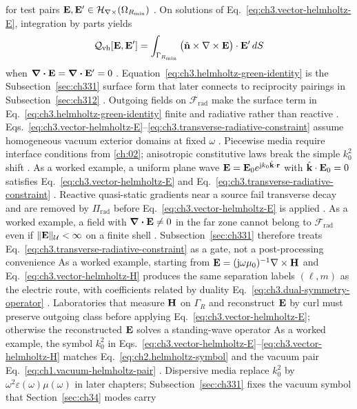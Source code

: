 for test pairs \(\mathbf{E},\mathbf{E}'\in\mathcal{H}_{\nabla\times}(\Omega_{R_{\min}})\) . On solutions of
Eq.~\eqref{eq:ch3.vector-helmholtz-E}, integration by parts yields
\begin{equation}
\label{eq:ch3.helmholtz-green-identity}
\mathcal{Q}_{\mathrm{vh}}[\mathbf{E},\mathbf{E}']
=
\int_{\Gamma_{R_{\min}}}
\big(\hat{\mathbf{n}}\times\nabla\times\mathbf{E}\big)\cdot\mathbf{E}'\,dS
\end{equation}
when \(\div\mathbf{E}=\div\mathbf{E}'=0\) . Equation~\eqref{eq:ch3.helmholtz-green-identity}
is the Subsection~\ref{sec:ch331} surface form that later connects to reciprocity pairings in
Subsection~\ref{sec:ch312} . Outgoing fields on
\(\mathcal{F}_{\mathrm{rad}}\) make the surface term in Eq.~\eqref{eq:ch3.helmholtz-green-identity} finite and
radiative rather than reactive .
Eqs.~\eqref{eq:ch3.vector-helmholtz-E}--\eqref{eq:ch3.transverse-radiative-constraint} assume homogeneous vacuum
exterior domains at fixed \(\omega\) . Piecewise media require interface conditions from
\ref{ch:02}; anisotropic constitutive laws break the simple \(k_0^2\) shift .
As a worked example, a uniform plane wave \(\mathbf{E}=\mathbf{E}_0 e^{\mathrm{j} k_0\hat{\mathbf{k}}\cdot\mathbf{r}}\) with \(\hat{\mathbf{k}}\cdot\mathbf{E}_0=0\)
satisfies Eq.~\eqref{eq:ch3.vector-helmholtz-E} and Eq.~\eqref{eq:ch3.transverse-radiative-constraint}
. Reactive quasi-static gradients near a source fail transverse decay and are removed by
\(\Pi_{\mathrm{rad}}\) before Eq.~\eqref{eq:ch3.vector-helmholtz-E} is applied .
As a worked example, a field with \(\div\mathbf{E}\neq0\) in the far zone cannot belong to \(\mathcal{F}_{\mathrm{rad}}\) even if
\(\|\mathbf{E}\|_{\mathcal{U}}<\infty\) on a finite shell . Subsection~\ref{sec:ch331} therefore treats
Eq.~\eqref{eq:ch3.transverse-radiative-constraint} as a gate, not a post-processing convenience
As a worked example, starting from \(\mathbf{E}=(\mathrm{j}\omega\mu_0)^{-1}\nabla\times\mathbf{H}\) and Eq.~\eqref{eq:ch3.vector-helmholtz-H} produces the same
separation labels \((\ell,m)\) as the electric route, with coefficients related by duality
Eq.~\eqref{eq:ch3.dual-symmetry-operator} . Laboratories that measure \(\mathbf{H}\)
on \(\Gamma_R\) and reconstruct \(\mathbf{E}\) by curl must preserve outgoing class before applying
Eq.~\eqref{eq:ch3.vector-helmholtz-E}; otherwise the reconstructed \(\mathbf{E}\) solves a standing-wave operator
As a worked example, the symbol \(k_0^2\) in Eqs.~\eqref{eq:ch3.vector-helmholtz-E}--\eqref{eq:ch3.vector-helmholtz-H} matches
Eq.~\eqref{eq:ch2.helmholtz-symbol} and the vacuum pair Eq.~\eqref{eq:ch1.vacuum-helmholtz-pair}
. Dispersive media replace \(k_0^2\) by \(\omega^2\varepsilon(\omega)\mu(\omega)\) in
later chapters; Subsection~\ref{sec:ch331} fixes the vacuum symbol that Section~\ref{sec:ch34} modes carry
